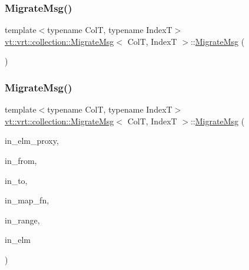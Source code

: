 \subsubsection{\texorpdfstring{Migrate\+Msg()}{MigrateMsg()}\hspace{0.1cm}{\footnotesize\ttfamily [1/2]}}
{\footnotesize\ttfamily template$<$typename ColT, typename IndexT$>$ \\
\hyperlink{structvt_1_1vrt_1_1collection_1_1_migrate_msg}{vt\+::vrt\+::collection\+::\+Migrate\+Msg}$<$ ColT, IndexT $>$\+::\hyperlink{structvt_1_1vrt_1_1collection_1_1_migrate_msg}{Migrate\+Msg} (\begin{DoxyParamCaption}{ }\end{DoxyParamCaption})\hspace{0.3cm}{\ttfamily [default]}}

\mbox{\label{structvt_1_1vrt_1_1collection_1_1_migrate_msg_a900313445de89550eca07334a2ca21ba}} 
\subsubsection{\texorpdfstring{Migrate\+Msg()}{MigrateMsg()}\hspace{0.1cm}{\footnotesize\ttfamily [2/2]}}
{\footnotesize\ttfamily template$<$typename ColT, typename IndexT$>$ \\
\hyperlink{structvt_1_1vrt_1_1collection_1_1_migrate_msg}{vt\+::vrt\+::collection\+::\+Migrate\+Msg}$<$ ColT, IndexT $>$\+::\hyperlink{structvt_1_1vrt_1_1collection_1_1_migrate_msg}{Migrate\+Msg} (\begin{DoxyParamCaption}\item[{\hyperlink{structvt_1_1vrt_1_1collection_1_1_vrt_elm_proxy}{Vrt\+Elm\+Proxy}$<$ ColT, IndexT $>$ const \&}]{in\+\_\+elm\+\_\+proxy,  }\item[{\hyperlink{namespacevt_a866da9d0efc19c0a1ce79e9e492f47e2}{Node\+Type} const \&}]{in\+\_\+from,  }\item[{\hyperlink{namespacevt_a866da9d0efc19c0a1ce79e9e492f47e2}{Node\+Type} const \&}]{in\+\_\+to,  }\item[{\hyperlink{namespacevt_af64846b57dfcaf104da3ef6967917573}{Handler\+Type} const \&}]{in\+\_\+map\+\_\+fn,  }\item[{IndexT const \&}]{in\+\_\+range,  }\item[{ColT $\ast$}]{in\+\_\+elm }\end{DoxyParamCaption})\hspace{0.3cm}{\ttfamily [inline]}}

